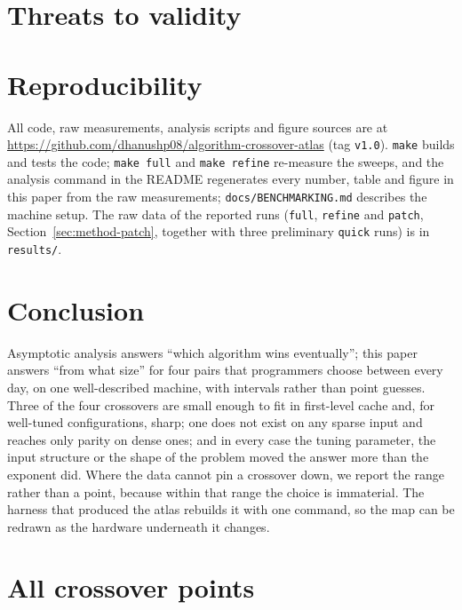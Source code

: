 \documentclass[11pt]{article}
\begin{document}


\section{Threats to validity}


\section{Reproducibility}\label{sec:repro}
All code, raw measurements, analysis scripts and figure sources are at
\url{https://github.com/dhanushp08/algorithm-crossover-atlas} (tag \texttt{v1.0}). \texttt{make} builds and tests the code;
\texttt{make full} and \texttt{make refine} re-measure the sweeps, and the
analysis command in the README regenerates every number, table and figure in
this paper from the raw measurements; \texttt{docs/BENCHMARKING.md} describes
the machine setup. The raw data of the reported runs (\texttt{full},
\texttt{refine} and \texttt{patch}, Section~\ref{sec:method-patch}, together
with three preliminary \texttt{quick} runs) is in \texttt{results/}.

\section{Conclusion}
Asymptotic analysis answers ``which algorithm wins eventually''; this paper
answers ``from what size'' for four pairs that programmers choose between every
day, on one well-described machine, with intervals rather than point guesses.
Three of the four crossovers are small enough to fit in first-level cache
and, for well-tuned configurations, sharp; one does not exist on any sparse
input and reaches only parity on dense ones; and in every case the tuning
parameter, the input structure or the shape of the problem moved the answer
more than the exponent did. Where the data cannot pin a crossover down, we report the range
rather than a point, because within that range the choice is immaterial.
The harness that produced the atlas rebuilds it with one command, so the map
can be redrawn as the hardware underneath it changes.




\clearpage
\appendix
\section{All crossover points}\label{app:table}
{\scriptsize

}
\end{document}
